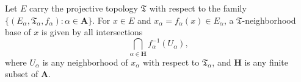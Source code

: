Let $E$ carry the projective topology $\mathfrak{T}$ with respect to the family $\{(E_\alpha, \mathfrak{T}_\alpha, f_\alpha): \alpha \in \mathbf{A}\}$. For $x \in E$ and $x_\alpha = f_\alpha(x) \in E_\alpha$, a $\mathfrak{T}$-neighborhood base of $x$ is given by all intersections
$$\bigcap_{\alpha \in \mathbf{H}} f_\alpha^{-1}(U_\alpha),$$
where $U_\alpha$ is any neighborhood of $x_\alpha$ with respect to $\mathfrak{T}_\alpha$, and $\mathbf{H}$ is any finite subset of $\mathbf{A}$.

